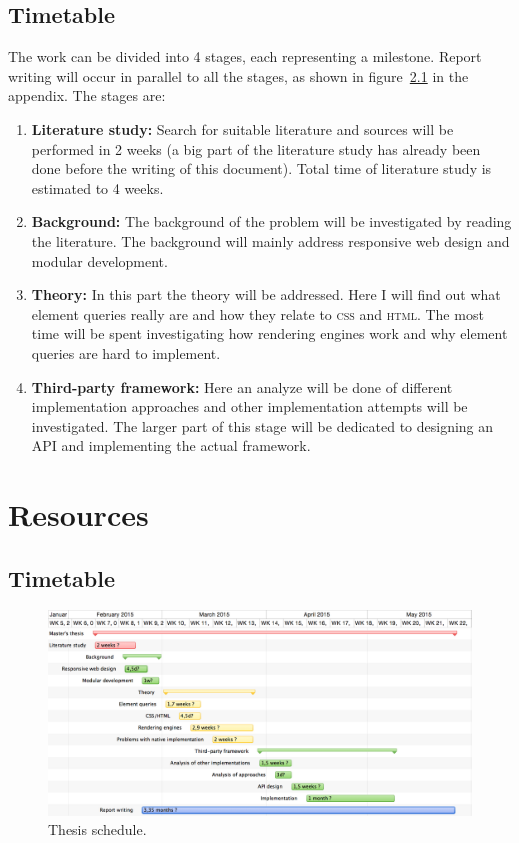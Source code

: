 \documentclass[oneside,a4paper,11pt]{kth-mag}
\begin{document}
\section{Timetable}
The work can be divided into 4 stages, each representing a milestone. Report writing will occur in parallel to all the stages, as shown in figure~\ref{fig:timetable} in the appendix. The stages are:
\begin{enumerate}
\item \textbf{Literature study:} Search for suitable literature and sources will be performed in 2 weeks (a big part of the literature study has already been done before the writing of this document). Total time of literature study is estimated to 4 weeks.
\item \textbf{Background:} The background of the problem will be investigated by reading the literature. The background will mainly address responsive web design and modular development.
\item \textbf{Theory:} In this part the theory will be addressed. Here I will find out what element queries really are and how they relate to \textsc{css} and \textsc{html}. The most time will be spent investigating how rendering engines work and why element queries are hard to implement.
\item \textbf{Third-party framework:} Here an analyze will be done of different implementation approaches and other implementation attempts will be investigated. The larger part of this stage will be dedicated to designing an API and implementing the actual framework.
\end{enumerate}

\appendix
\addappheadtotoc
\chapter{Resources}
\section{Timetable}

\clearpage
\newpage

\begin{figure}
\centering
\includegraphics{timetable}
\caption{Thesis schedule.}
\label{fig:timetable}
\end{figure}
\restoregeometry
\end{document}
